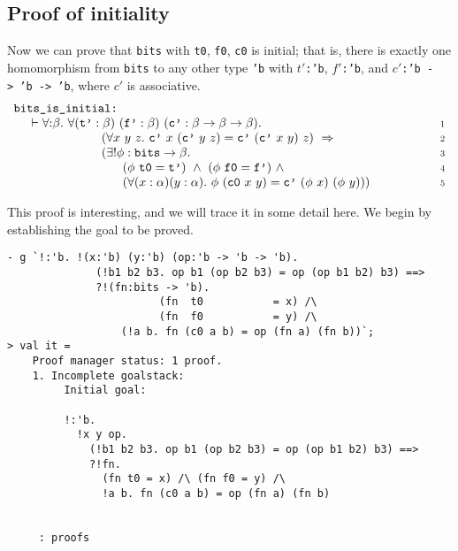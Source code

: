\subsection{Proof of initiality}

Now we can prove that \texttt{bits} with \texttt{t0}, \texttt{f0},
\texttt{c0} is initial; that is, there is exactly one homomorphism
from \texttt{bits} to any other type \texttt{'b} with $t'$\texttt{:'b},
$f'$\texttt{:'b}, and $c'$\texttt{:'b~->~'b~->~'b}, where $c'$ is associative.
\[
\begin{array}[t]{l@{\hspace{5mm}}l@{\hspace{20mm}}r}
\multicolumn{3}{l}{
\mbox{\tt bits\_is\_initial:}} \\
& \vdash
   \forall{:} \beta.\ 
    \forall (\mbox{\tt t'}:\beta)\ (\mbox{\tt f'}:\beta)\ 
            (\mbox{\tt c'}:\beta \rightarrow \beta \rightarrow \beta). &
\mbox{\scriptsize \textsc{1}} \\
 & \hspace{20mm}
   (\forall x\ y\ z.\ \mbox{\tt c'}\ x\ (\mbox{\tt c'}\ y\ z) =
                      \mbox{\tt c'}\ (\mbox{\tt c'}\ x\ y)\ z) \ \Rightarrow &
\mbox{\scriptsize \textsc{2}} \\
 & \hspace{20mm}
   (\exists ! \phi : \mbox{\tt bits} \rightarrow \beta. &
\mbox{\scriptsize \textsc{3}} \\
 & \hspace{26mm}
   (\phi\ \mbox{\tt t0} = \mbox{\tt t'}) \ \wedge \ 
   (\phi\ \mbox{\tt f0} = \mbox{\tt f'}) \ \wedge &
\mbox{\scriptsize \textsc{4}} \\
 & \hspace{26mm}
   (\forall (x:\alpha) (y:\alpha).\ \phi\ (\mbox{\tt c0}\ x\ y) =
                                    \mbox{\tt c'}\ (\phi\ x)\ (\phi\ y))) & \mbox{\scriptsize \textsc{5}} 
\end{array}
\]

This proof is interesting, and we will trace it in some detail here. We begin
by establishing the goal to be proved.
%
\begin{session}
\begin{verbatim}
- g `!:'b. !(x:'b) (y:'b) (op:'b -> 'b -> 'b).
              (!b1 b2 b3. op b1 (op b2 b3) = op (op b1 b2) b3) ==>
              ?!(fn:bits -> 'b).
                        (fn  t0           = x) /\
                        (fn  f0           = y) /\
                  (!a b. fn (c0 a b) = op (fn a) (fn b))`;
> val it =
    Proof manager status: 1 proof.
    1. Incomplete goalstack:
         Initial goal:
    
         !:'b.
           !x y op.
             (!b1 b2 b3. op b1 (op b2 b3) = op (op b1 b2) b3) ==>
             ?!fn.
               (fn t0 = x) /\ (fn f0 = y) /\
               !a b. fn (c0 a b) = op (fn a) (fn b)
    
    
     : proofs
\end{verbatim}
\end{session}

